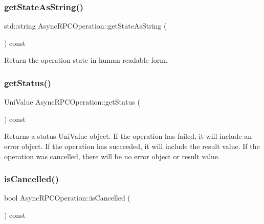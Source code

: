 \mbox{\label{class_async_r_p_c_operation_a03b6422d357c20f8d635fb2ddcf05c7c}} 
\subsubsection{\texorpdfstring{get\+State\+As\+String()}{getStateAsString()}}
{\footnotesize\ttfamily std\+::string Async\+R\+P\+C\+Operation\+::get\+State\+As\+String (\begin{DoxyParamCaption}{ }\end{DoxyParamCaption}) const}

Return the operation state in human readable form. \mbox{\label{class_async_r_p_c_operation_a5e448738dc1ee9504602cda249e992a9}} 
\subsubsection{\texorpdfstring{get\+Status()}{getStatus()}}
{\footnotesize\ttfamily Uni\+Value Async\+R\+P\+C\+Operation\+::get\+Status (\begin{DoxyParamCaption}{ }\end{DoxyParamCaption}) const\hspace{0.3cm}{\ttfamily [virtual]}}

Returns a status Uni\+Value object. If the operation has failed, it will include an error object. If the operation has succeeded, it will include the result value. If the operation was cancelled, there will be no error object or result value. \mbox{\label{class_async_r_p_c_operation_ac7b3093bed8fa04841cc618b3517babd}} 
\subsubsection{\texorpdfstring{is\+Cancelled()}{isCancelled()}}
{\footnotesize\ttfamily bool Async\+R\+P\+C\+Operation\+::is\+Cancelled (\begin{DoxyParamCaption}{ }\end{DoxyParamCaption}) const\hspace{0.3cm}{\ttfamily [inline]}}

